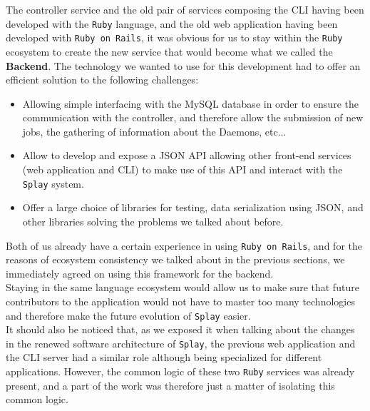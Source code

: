 \documentclass{eplmastersthesis}
\begin{document}
        The controller service and the old pair of services composing the CLI
        having been developed with the \texttt{Ruby} language, and the old web
        application having been developed with \texttt{Ruby on Rails}, it was obvious
        for us to stay within the \texttt{Ruby} ecosystem to create the new service
        that would become what we called the \textbf{Backend}. The technology
        we wanted to use for this development had to offer an efficient
        solution to the following challenges:

        \begin{itemize}
          \item Allowing simple interfacing with the MySQL database in order
          to ensure the communication with the controller, and therefore allow
          the submission of new jobs, the gathering of information about the
          Daemons, etc...
          \item Allow to develop and expose a JSON API allowing other front-end
          services (web application and CLI) to make use of this API and
          interact with the \texttt{Splay} system.
          \item Offer a large choice of libraries for testing, data
          serialization using JSON, and other libraries solving the problems
          we talked about before.
        \end{itemize}

        Both of us already have a certain experience in using \texttt{Ruby on
        Rails}, and for the reasons of ecosystem consistency we talked about
        in the previous sections, we immediately agreed on using this
        framework for the backend.\\
        Staying in the same language ecosystem would allow us to make sure
        that future contributors to the application would not have to master
        too many technologies and therefore make the future evolution
        of \texttt{Splay} easier.\\

        It should also be noticed that, as we exposed it when talking about the
        changes in the renewed software architecture of \texttt{Splay}, the previous
        web application and the CLI server had a similar role although being
        specialized for different applications. However, the common logic
        of these two \texttt{Ruby} services was already present, and a part of the
        work was therefore just a matter of isolating this common logic.\\
\end{document}
